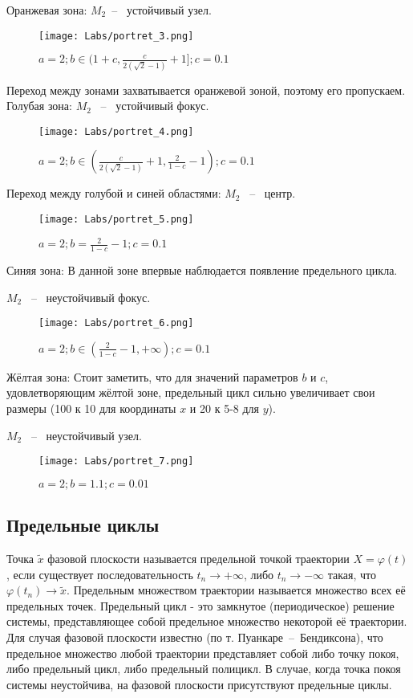 \documentclass[a4paper,14pt]{extarticle}
\begin{document}
\newpage
Оранжевая зона:
$M_2$~--~ устойчивый узел.
\begin{figure}[!h]
\centering
\texttt{[image: Labs/portret\_3.png]}
\caption{$a = 2;b \in (1 + c, \frac{c}{2(\sqrt2-1)}+1];c = 0.1$}
\label{prt3.1}
\end{figure}

\newpage
Переход между зонами захватывается оранжевой зоной, поэтому его пропускаем.
Голубая зона:
$M_2$ ~--~ устойчивый фокус.
\begin{figure}[!h]
\centering
\texttt{[image: Labs/portret\_4.png]}
\caption{$a = 2; b \in (\frac{c}{2(\sqrt2-1)}+1, \frac{2}{1 - c}-1); c = 0.1$}
\label{prt4}
\end{figure}

\newpage
Переход между голубой и синей областями:
$M_2$ ~--~ центр.
\begin{figure}[!h]
\centering
\texttt{[image: Labs/portret\_5.png]}
\caption{$a = 2; b = \frac{2}{1 - c}-1; c = 0.1$}
\label{prt5}
\end{figure}

\newpage
Синяя зона:
В данной зоне впервые наблюдается появление предельного цикла.

$M_2$ ~--~ неустойчивый фокус.
\begin{figure}[!h]
\centering
\texttt{[image: Labs/portret\_6.png]}
\caption{$a = 2; b \in (\frac{2}{1 - c}-1, +\infty); c = 0.1$}
\label{prt6}
\end{figure}

\newpage
Жёлтая зона:
Стоит заметить, что для значений параметров $b$ и $c$, удовлетворяющим жёлтой зоне, предельный цикл сильно увеличивает свои размеры (100 к 10 для координаты $x$ и 20 к 5-8 для $y$).

$M_2$ ~--~ неустойчивый узел.
\begin{figure}[!h]
\centering
\texttt{[image: Labs/portret\_7.png]}
\caption{$a = 2; b = 1.1; c = 0.01$}
\label{prt7}
\end{figure}

\newpage
\subsection{Предельные циклы}

Точка $\widetilde{x}$ фазовой плоскости называется предельной точкой траектории $X = \varphi \left(t\right)$, если существует последовательность $t_n \to +\infty$, либо $t_n \to -\infty$ такая, что $\varphi \left(t_n\right) \to \widetilde{x}$. Предельным множеством траектории называется множество всех её предельных точек. Предельный цикл - это замкнутое (периодическое) решение системы, представляющее собой предельное множество некоторой её траектории. Для случая фазовой плоскости известно (по т. Пуанкаре~--~Бендиксона), что предельное множество любой траектории представляет собой либо точку покоя, либо предельный цикл, либо предельный полицикл. В случае, когда точка покоя системы неустойчива, на фазовой плоскости присутствуют предельные циклы.
\end{document}
